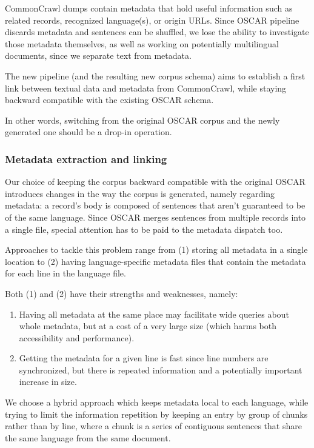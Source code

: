 CommonCrawl dumps contain metadata that hold useful information such as related records, recognized language(s), or origin URLs. Since OSCAR pipeline discards metadata and sentences can be shuffled, we lose the ability to investigate those metadata themselves, as well as working on potentially multilingual documents, since we separate text from metadata.

The new pipeline (and the resulting new corpus schema) aims to establish a first link between textual data and metadata from CommonCrawl, while staying backward compatible with the existing OSCAR schema.

In other words, switching from the original OSCAR corpus and the newly generated one should be a drop-in operation.

\subsubsection{Metadata extraction and linking}
Our choice of keeping the corpus backward compatible with the original OSCAR introduces changes in the way the corpus is generated, namely regarding metadata: a record's body is composed of sentences that aren't guaranteed to be of the same language.
Since OSCAR merges sentences from multiple records into a single file, special attention has to be paid to the metadata dispatch too.

Approaches to tackle this problem range from (1) storing all metadata in a single location to (2) having language-specific metadata files that contain the metadata for each line in the language file.

Both (1) and (2) have their strengths and weaknesses, namely:
\begin{enumerate}
    \item Having all metadata at the same place may facilitate wide queries about whole metadata, but at a cost of a very large size (which harms both accessibility and performance).
    \item Getting the metadata for a given line is fast since line numbers are synchronized, but there is repeated information and a potentially important increase in size.
\end{enumerate}

We choose a hybrid approach which keeps metadata local to each language, while trying to limit the information repetition by keeping an entry by group of chunks rather than by line, where a chunk is a series of contiguous sentences that share the same language from the same document.

